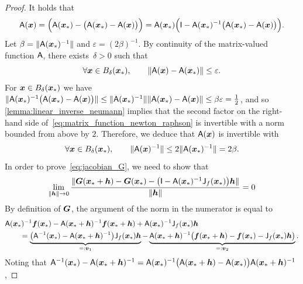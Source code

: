 \begin{proof}
    It holds that
    \begin{equation}
        \label{eq:matrix_function_newton_raphson}
        \mathsf A(\mathbf{\boldsymbol{x}})
        = \Bigl(\mathsf A(\mathbf{\boldsymbol{x}}_*) - \bigl(\mathsf A(\mathbf{\boldsymbol{x}}_*) - \mathsf A(\mathbf{\boldsymbol{x}})\bigr)\Bigr)
        = \mathsf A(\mathbf{\boldsymbol{x}}_*) \Bigl(\mathsf I - \mathsf A(\mathbf{\boldsymbol{x}}_*)^{-1} \bigl(\mathsf A(\mathbf{\boldsymbol{x}}_*) - \mathsf A(\mathbf{\boldsymbol{x}})\bigr)\Bigr).
    \end{equation}
    Let $\beta = \lVert\mathsf A(\mathbf{\boldsymbol{x}}_*)^{-1}\rVert$ and $\varepsilon = (2 \beta)^{-1}$.
    By continuity of the matrix-valued function $\mathsf A$,
    there exists~$\delta > 0$ such that
    \[
        \forall \mathbf{\boldsymbol{x}} \in B_{\delta}(\mathbf{\boldsymbol{x}}_*), \qquad
        \lVert\mathsf A(\mathbf{\boldsymbol{x}}) - \mathsf A(\mathbf{\boldsymbol{x}}_*)\rVert \leq \varepsilon.
    \]
    For $\mathbf{\boldsymbol{x}} \in B_{\delta}(\mathbf{\boldsymbol{x}}_*)$ we have $\lVert\mathsf A(\mathbf{\boldsymbol{x}}_*)^{-1} \bigl(\mathsf A(\mathbf{\boldsymbol{x}}_*) - \mathsf A(\mathbf{\boldsymbol{x}})\bigr)\rVert \leq \lVert\mathsf A(\mathbf{\boldsymbol{x}}_*)^{-1}\rVert \lVert\mathsf A(\mathbf{\boldsymbol{x}}_*) - \mathsf A(\mathbf{\boldsymbol{x}})\rVert \leq \beta \varepsilon = \frac{1}{2}$,
    and so \cref{lemma:linear_inverse_neumann} implies that the second factor
    on the right-hand side of~\eqref{eq:matrix_function_newton_raphson} is invertible with a norm bounded from above by $2$.
    Therefore, we deduce that $\mathsf A(\mathbf{\boldsymbol{x}})$ is invertible with
    \[
        \forall \mathbf{\boldsymbol{x}} \in B_{\delta}(\mathbf{\boldsymbol{x}}_*), \qquad
        \lVert\mathsf A(\mathbf{\boldsymbol{x}})^{-1}\rVert \leq 2\lVert\mathsf A(\mathbf{\boldsymbol{x}}_*)^{-1}\rVert = 2 \beta.
    \]
    In order to prove~\eqref{eq:jacobian_G},
    we need to show that
    \[
        \lim_{\norm{\vect h} \to 0} \frac{\norm[big]{\vect G(\vect x_* + \vect h) - \vect G(\vect x_*) - \bigl(\mat I - \mat A(\vect x_*)^{-1} \mat J_f(\vect x_*)\bigr) \vect h}}{\norm {\vect h}} = 0
    \]
    By definition of $\mathbf{\boldsymbol{G}}$, the argument of the norm in the numerator is equal to
    \begin{align*}
        &\mathsf A (\mathbf{\boldsymbol{x}}_*)^{-1} \mathbf{\boldsymbol{f}}(\mathbf{\boldsymbol{x}}_*) - \mathsf A (\mathbf{\boldsymbol{x}}_* + \mathbf{\boldsymbol{h}})^{-1} \mathbf{\boldsymbol{f}}(\mathbf{\boldsymbol{x}}_* + \mathbf{\boldsymbol{h}}) + \mathsf A(\mathbf{\boldsymbol{x}}_*)^{-1} \mathsf J_f(\mathbf{\boldsymbol{x}}_*) \mathbf{\boldsymbol{h}} \\
        &\qquad =
        \underbrace{\bigl( \mathsf A^{-1}(\mathbf{\boldsymbol{x}}_*) - \mathsf A(\mathbf{\boldsymbol{x}}_* + \mathbf{\boldsymbol{h}})^{-1} \bigr) \mathsf J_f(\mathbf{\boldsymbol{x}}_*) \mathbf{\boldsymbol{h}}}_{=: \mathbf{\boldsymbol{v}}_1}
        - \underbrace{\mathsf A (\mathbf{\boldsymbol{x}}_* + \mathbf{\boldsymbol{h}})^{-1} \bigl( \mathbf{\boldsymbol{f}}(\mathbf{\boldsymbol{x}}_* + \mathbf{\boldsymbol{h}}) - \mathbf{\boldsymbol{f}}(\mathbf{\boldsymbol{x}}_*) - \mathsf J_f(\mathbf{\boldsymbol{x}}_*) \mathbf{\boldsymbol{h}}\bigr)}_{=: \mathbf{\boldsymbol{v}}_2}.
    \end{align*}
    Noting that $ \mathsf A^{-1}(\mathbf{\boldsymbol{x}}_*) - \mathsf A(\mathbf{\boldsymbol{x}}_* + \mathbf{\boldsymbol{h}})^{-1} = \mathsf A(\mathbf{\boldsymbol{x}}_*)^{-1} \bigl(\mathsf A(\mathbf{\boldsymbol{x}}_* + \mathbf{\boldsymbol{h}}) - \mathsf A(\mathbf{\boldsymbol{x}}_*)\bigr) \mathsf A(\mathbf{\boldsymbol{x}}_* + \mathbf{\boldsymbol{h}})^{-1}$,

\end{proof}

